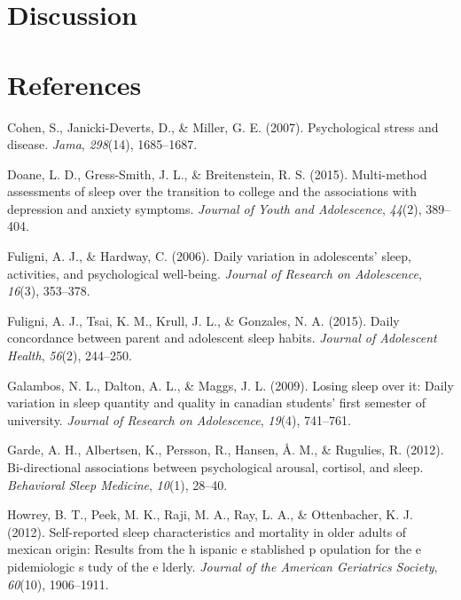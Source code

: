 \documentclass[man, fleqn, noextraspace]{apa6}
\begin{document}
\hypertarget{discussion}{%
\section{Discussion}\label{discussion}}

\newpage

\hypertarget{references}{%
\section{References}\label{references}}

\begingroup
\setlength{\parindent}{-0.5in}
\setlength{\leftskip}{0.5in}

\hypertarget{refs}{}
\leavevmode\hypertarget{ref-cohen2007_psych}{}%
Cohen, S., Janicki-Deverts, D., \& Miller, G. E. (2007). Psychological stress and disease. \emph{Jama}, \emph{298}(14), 1685--1687.

\leavevmode\hypertarget{ref-doane2015multi}{}%
Doane, L. D., Gress-Smith, J. L., \& Breitenstein, R. S. (2015). Multi-method assessments of sleep over the transition to college and the associations with depression and anxiety symptoms. \emph{Journal of Youth and Adolescence}, \emph{44}(2), 389--404.

\leavevmode\hypertarget{ref-fuligni2006daily}{}%
Fuligni, A. J., \& Hardway, C. (2006). Daily variation in adolescents' sleep, activities, and psychological well-being. \emph{Journal of Research on Adolescence}, \emph{16}(3), 353--378.

\leavevmode\hypertarget{ref-fuligni2015daily}{}%
Fuligni, A. J., Tsai, K. M., Krull, J. L., \& Gonzales, N. A. (2015). Daily concordance between parent and adolescent sleep habits. \emph{Journal of Adolescent Health}, \emph{56}(2), 244--250.

\leavevmode\hypertarget{ref-galambos2009losing}{}%
Galambos, N. L., Dalton, A. L., \& Maggs, J. L. (2009). Losing sleep over it: Daily variation in sleep quantity and quality in canadian students' first semester of university. \emph{Journal of Research on Adolescence}, \emph{19}(4), 741--761.

\leavevmode\hypertarget{ref-garde_2012_bi}{}%
Garde, A. H., Albertsen, K., Persson, R., Hansen, Å. M., \& Rugulies, R. (2012). Bi-directional associations between psychological arousal, cortisol, and sleep. \emph{Behavioral Sleep Medicine}, \emph{10}(1), 28--40.

\leavevmode\hypertarget{ref-howrey2012self}{}%
Howrey, B. T., Peek, M. K., Raji, M. A., Ray, L. A., \& Ottenbacher, K. J. (2012). Self-reported sleep characteristics and mortality in older adults of mexican origin: Results from the h ispanic e stablished p opulation for the e pidemiologic s tudy of the e lderly. \emph{Journal of the American Geriatrics Society}, \emph{60}(10), 1906--1911.
\end{document}
